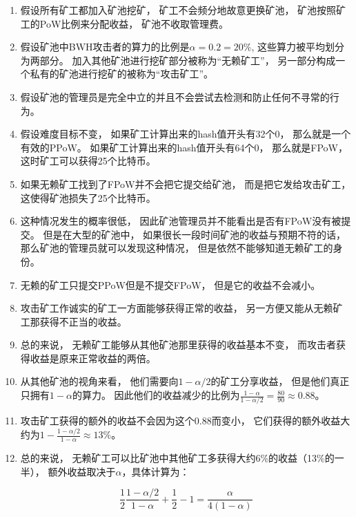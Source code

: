 \documentclass[a4paper, 11pt]{article}
\begin{document}
\begin{CJK*}{UTF8}{gbsn}
    \begin{enumerate}
        \item 假设所有矿工都加入矿池挖矿，
        矿工不会频分地故意更换矿池，
        矿池按照矿工的PoW比例来分配收益，
        矿池不收取管理费。
        \item 假设矿池中BWH攻击者的算力的比例是$\alpha = 0.2 = 20\%$,
        这些算力被平均划分为两部分。
        加入其他矿池进行挖矿部分被称为“无赖矿工”，
        另一部分构成一个私有的矿池进行挖矿的被称为“攻击矿工”。
        \item 假设矿池的管理员是完全中立的并且不会尝试去检测和防止任何不寻常的行为。
        \item 假设难度目标不变，
        如果矿工计算出来的hash值开头有32个0，
        那么就是一个有效的PPoW。
        如果矿工计算出来的hash值开头有64个0，
        那么就是FPoW，
        这时矿工可以获得25个比特币。
        \item 如果无赖矿工找到了FPoW并不会把它提交给矿池，
        而是把它发给攻击矿工，
        这使得矿池损失了25个比特币。
        \item 这种情况发生的概率很低，
        因此矿池管理员并不能看出是否有FPoW没有被提交。
        但是在大型的矿池中，
        如果很长一段时间矿池的收益与预期不符的话，
        那么矿池的管理员就可以发现这种情况，
        但是依然不能够知道无赖矿工的身份。
        \item 无赖的矿工只提交PPoW但是不提交FPoW，
        但是它的收益不会减小。
        \item 攻击矿工作诚实的矿工一方面能够获得正常的收益，
        另一方便又能从无赖矿工那获得不正当的收益。
        \item 总的来说，
        无赖矿工能够从其他矿池那里获得的收益基本不变，
        而攻击者获得收益是原来正常收益的两倍。
        \item 从其他矿池的视角来看，
        他们需要向$1 - \alpha/2$的矿工分享收益，
        但是他们真正只拥有$1 - \alpha$的算力。
        因此他们的收益减少的比例为$\frac{1-\alpha}{1-\alpha/2} = \frac{80}{90} \approx 0.88$。
        \item 攻击矿工获得的额外的收益不会因为这个0.88而变小，
        它们获得的额外收益大约为$1 - \frac{1-\alpha/2}{1-\alpha} \approx 13\%$。
        \item 总的来说，
        无赖矿工可以比矿池中其他矿工多获得大约6\%的收益（13\%的一半），
        额外收益取决于$\alpha$，具体计算为：

        \begin{equation}
            \frac{1}{2} \frac{1-\alpha/2}{1-\alpha} + \frac{1}{2} - 1 = \frac{\alpha}{4(1-\alpha)}
        \end{equation}


\end{enumerate}
\end{CJK*}
\end{document}
